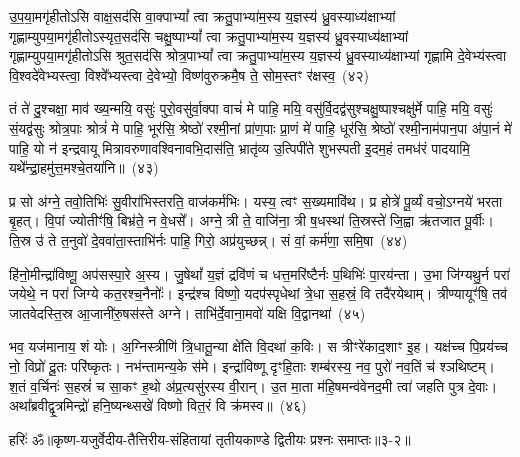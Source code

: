 उ॒प॒या॒मगृ॑हीतो\-ऽसि वाक्ष॒सद॑सि वा॒क्पा\-भ्यां᳚ त्वा क्रतु॒पाभ्या॑म॒स्य य॒ज्ञस्य॑ ध्रु॒वस्याध्य॑क्षाभ्यां गृह्णाम्युपया॒मगृ॑हीतो\-ऽस्यृत॒सद॑सि चक्षु॒ष्पा\-भ्यां᳚ त्वा क्रतु॒पाभ्या॑म॒स्य य॒ज्ञस्य॑ ध्रु॒वस्याध्य॑क्षाभ्यां गृह्णाम्युपया॒मगृ॑हीतो\-ऽसि श्रुत॒सद॑सि श्रोत्र॒पा\-भ्यां᳚ त्वा क्रतु॒पाभ्या॑म॒स्य य॒ज्ञस्य॑ ध्रु॒वस्याध्य॑क्षाभ्यां गृह्णामि दे॒वेभ्य॑स्त्वा वि॒श्वदे॑वेभ्यस्त्वा॒ विश्वे᳚भ्यस्त्वा दे॒वेभ्यो॒ विष्ण॑वुरुक्रमै॒ष ते॒ सोम॒स्तꣳ र॑क्षस्व॒~(४२)\ip

तं ते॑ दु॒श्चक्षा॒ माव॑ ख्य॒न्मयि॒ वसुः॑ पुरो॒वसु॑र्वा॒क्पा वाचं॑ मे पाहि॒ मयि॒ वसु॑र्वि॒दद्व॑सुश्चक्षु॒ष्पाश्चक्षु॑र्मे पाहि॒ मयि॒ वसुः॑ सं॒यद्व॑सुः श्रोत्र॒पाः श्रोत्रं॑ मे पाहि॒ भूर॑सि॒ श्रेष्ठो॑ रश्मी॒नां प्रा॑ण॒पाः प्रा॒णं मे॑ पाहि॒ धूर॑सि॒ श्रेष्ठो॑ रश्मी॒नाम॑पान॒पा अ॑पा॒नं मे॑ पाहि॒ यो न॑ इन्द्रवायू मित्रावरुणावश्विनावभि॒दास॑ति॒ भ्रातृ॑व्य उ॒त्पिपी॑ते शुभस्पती इ॒दम॒हं तमध॑रं पादयामि॒ यथे᳚न्द्रा॒हमु॑त्त॒मश्चे॒तया॑नि॥~(४३)\ip

{\anuvakamend[{र॒क्ष॒स्व॒ भ्रातृ॑व्य॒स्त्रयो॑दश च}]}%

प्र सो अ॑ग्ने॒ तवो॒तिभिः॑ सु॒वीरा॑भिस्तरति॒ वाज॑कर्मभिः। यस्य॒ त्वꣳ स॒ख्यमावि॑थ। प्र होत्रे॑ पू॒र्व्यं वचो॒\-ऽग्नये॑ भरता बृ॒हत्। वि॒पां ज्योतीꣳ॑षि॒ बिभ्र॑ते॒ न वे॒धसे᳚। अग्ने॒ त्री ते॒ वाजि॑ना॒ त्री ष॒धस्था॑ ति॒स्रस्ते॑ जि॒ह्वा ऋ॑तजात पू॒र्वीः। ति॒स्र उ॑ ते त॒नुवो॑ दे॒ववा॑ता॒स्ताभि॑र्नः पाहि॒ गिरो॒ अप्र॑युच्छन्न्। सं वां॒ कर्म॑णा॒ समि॒षा~(४४)\ip

हि॑नो॒मीन्द्रा॑विष्णू॒ अप॑सस्पा॒रे अ॒स्य। जु॒षेथां᳚ य॒ज्ञं द्रवि॑णं च धत्त॒मरि॑ष्टैर्नः प॒थिभिः॑ पा॒रय॑न्ता। उ॒भा जि॑ग्यथु॒र्न परा॑ जयेथे॒ न परा॑ जिग्ये कत॒रश्च॒नैनोः᳚। इन्द्र॑श्च विष्णो॒ यदप॑स्पृधेथां त्रे॒धा स॒हस्रं॒ वि तदै॑रयेथाम्। त्रीण्यायूꣳ॑षि॒ तव॑ जातवेदस्ति॒स्र आ॒जानी॑रु॒षस॑स्ते अग्ने। ताभि॑र्दे॒वाना॒मवो॑ यक्षि वि॒द्वानथा॑~(४५)\ip

भव॒ यज॑मानाय॒ शं योः। अ॒ग्निस्त्रीणि॑ त्रि॒धातू॒न्या क्षे॑ति वि॒दथा॑ क॒विः। स त्रीꣳरे॑काद॒शाꣳ इ॒ह। यक्ष॑च्च पि॒प्रय॑च्च नो॒ विप्रो॑ दू॒तः परि॑ष्कृतः। नभ॑न्तामन्य॒के स॑मे। इन्द्रा॑विष्णू दृꣳहि॒ताः शम्ब॑रस्य॒ नव॒ पुरो॑ नव॒तिं च॑ श्ञथिष्टम्। श॒तं व॒र्चिनः॑ स॒हस्रं॑ च सा॒कꣳ ह॒थो अ॑प्र॒त्यसु॑रस्य वी॒रान्। उ॒त मा॒ता म॑हि॒षमन्व॑वेनद॒मी त्वा॑ जहति पुत्र दे॒वाः। अथा᳚ब्रवीद्वृ॒त्रमिन्द्रो॑ हनि॒ष्यन्थ्सखे॑ विष्णो वित॒रं वि क्र॑मस्व॥~(४६)\ip

{\anuvakamend[{इ॒षा\-ऽथ॑ त्वा॒ त्रयो॑दश च}]}%

{हरिः॑ ॐ}{॥कृष्ण-यजुर्वेदीय-तैत्तिरीय-संहितायां तृतीयकाण्डे द्वितीयः प्रश्नः समाप्तः॥३-२॥}


